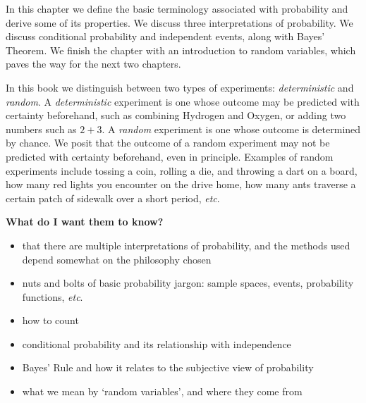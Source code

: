 \documentclass[captions=tableheading]{scrbook}
\begin{document}
\noindent 
In this chapter we define the basic terminology associated with probability and derive some of its properties. We discuss three interpretations of probability. We discuss conditional probability and independent events, along with Bayes' Theorem. We finish the chapter with an introduction to random variables, which paves the way for the next two chapters.

In this book we distinguish between two types of experiments: \emph{deterministic} and \emph{random}. A \emph{deterministic} experiment is one whose outcome may be predicted with certainty beforehand, such as combining Hydrogen and Oxygen, or adding two numbers such as \(2+3\). A \emph{random} experiment is one whose outcome is determined by chance. We posit that the outcome of a random experiment may not be predicted with certainty beforehand, even in principle. Examples of random experiments include tossing a coin, rolling a die, and throwing a dart on a board, how many red lights you encounter on the drive home, how many ants traverse a certain patch of sidewalk over a short period, \emph{etc}.

 \textbf{What do I want them to know?}
\begin{itemize}
\item that there are multiple interpretations of probability, and the methods used depend somewhat on the philosophy chosen
\item nuts and bolts of basic probability jargon: sample spaces, events, probability functions, \emph{etc}.
\item how to count
\item conditional probability and its relationship with independence
\item Bayes' Rule and how it relates to the subjective view of probability
\item what we mean by `random variables', and where they come from
\end{itemize}
\end{document}
